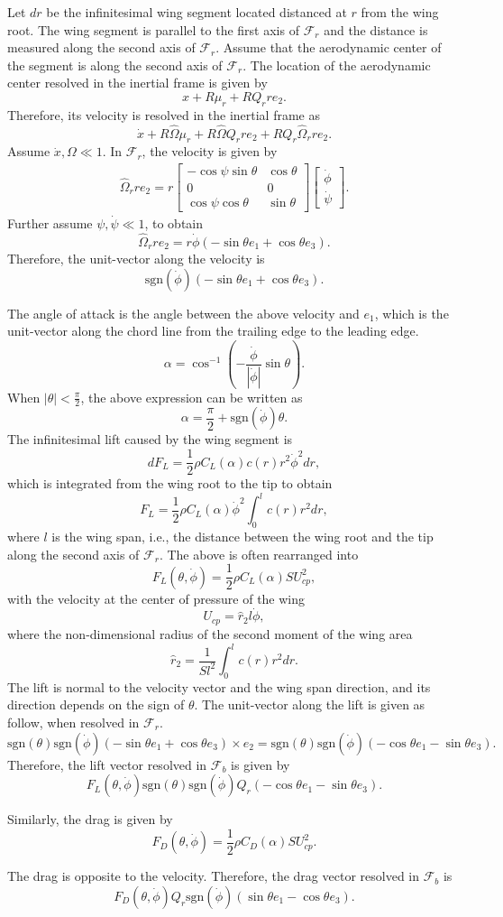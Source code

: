 \documentclass[10pt]{article}
\begin{document}
Let $dr$ be the infinitesimal wing segment located distanced at $r$ from the wing root. 
The wing segment is parallel to the first axis of $\mathcal{F}_r$ and the distance is measured along the second axis of $\mathcal{F}_r$. 
Assume that the aerodynamic center of the segment is along the second axis of $\mathcal{F}_r$.
The location of the aerodynamic center resolved in the inertial frame is given by
\[
    x+R\mu_r + RQ_r r e_2.
\]
Therefore, its velocity is resolved in the inertial frame as
\[
    \dot x+ R\hat\Omega \mu_r + R\hat\Omega Q_r re_2 + R Q_r \hat \Omega_r r e_2.
\]
Assume $\dot x, \Omega\ll 1$. 
In $\mathcal{F}_r$, the velocity is given by
\begin{align*}
    \hat \Omega_r r e_2 = 
    r  \begin{bmatrix}
        -\cos\psi\sin\theta & \cos\theta \\
        0 & 0 \\
    \cos\psi\cos\theta &  \sin\theta\end{bmatrix}
    \begin{bmatrix}
        \dot\phi \\ \dot\psi
    \end{bmatrix}.
\end{align*}
Further assume $\psi,\dot\psi \ll  1$, to obtain
\[
    \hat\Omega_r r e_2 = r \dot\phi (-\sin\theta e_1 + \cos\theta e_3) .
\]
Therefore, the unit-vector along the velocity is 
\[
    \mathrm{sgn}(\dot\phi) (-\sin\theta e_1 + \cos\theta e_3) .
\]

The angle of attack is the angle between the above velocity and $e_1$, which is the unit-vector along the chord line from the trailing edge to the leading edge.
\[
    \alpha = \cos^{-1} (-\frac{\dot\phi}{|\dot\phi|} \sin\theta).
\]
When $|\theta|<\frac{\pi}{2}$, the above expression can be written as
\[
    \alpha = \frac{\pi}{2} + \mathrm{sgn}(\dot\phi) \theta.
\]
The infinitesimal lift caused by the wing segment is 
\[
    dF_L = \frac{1}{2}\rho C_L(\alpha) c(r) r^2 \dot\phi^2 dr,
\]
which is integrated from the wing root to the tip to obtain
\[
    F_L = \frac{1}{2}\rho C_L(\alpha) \dot\phi^2 \int_{0}^l c(r) r^2 dr,
\]
where $l$ is the wing span, i.e., the distance between the wing root and the tip along the second axis of $\mathcal{F}_r$.
The above is often rearranged into 
\[
    F_L(\theta,\dot\phi) = \frac{1}{2}\rho  C_L(\alpha) S U_{cp}^2,
\]
with the velocity at the center of pressure of the wing 
\[
    U_{cp} = \hat r_2 l \dot\phi,
\]
where the non-dimensional radius of the second moment of the wing area
\[
    \hat r_2 = \frac{1}{S l^2} \int_0^l c(r) r^2 dr.
\]
The lift is normal to the velocity vector and the wing span direction, and its direction depends on the sign of $\theta$.
The unit-vector along the lift is given as follow, when resolved in $\mathcal{F}_r$.
\[
    \mathrm{sgn}(\theta) \mathrm{sgn}(\dot\phi) (-\sin\theta e_1 + \cos\theta e_3)\times e_2 =\mathrm{sgn}(\theta) \mathrm{sgn}(\dot\phi) (-\cos\theta e_1 - \sin\theta e_3).
\]
Therefore, the lift vector resolved in $\mathcal{F}_b$ is given by
\[
    F_L(\theta,\dot\phi) \mathrm{sgn}(\theta) \mathrm{sgn}(\dot\phi) Q_r  (-\cos\theta e_1 - \sin\theta e_3).
\]




Similarly, the drag is given by
\[
    F_D(\theta,\dot\phi) = \frac{1}{2}\rho  C_D(\alpha) S U_{cp}^2.
\]

The drag is opposite to the velocity.
Therefore, the drag vector resolved in $\mathcal{F}_b$ is
\[
    F_D(\theta,\dot\phi)  Q_r \mathrm{sgn}(\dot\phi) (\sin\theta e_1 -\cos\theta e_3).
\]
\end{document}
